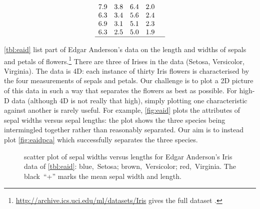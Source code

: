 \begin{example}
\begin{table}
\begin{equation*}
\begin{array}{rrrrl}
\\7.9&3.8&6.4&2.0&
\\6.3&3.4&5.6&2.4&
\\6.9&3.1&5.1&2.3&
\\6.3&2.5&5.0&1.9&
\\\hline
\end{array}
\end{equation*}
\end{table}
\autoref{tbl:eaid} list part of Edgar Anderson's data on the length and widths of sepals and petals of  flowers.\footnote{\url{http://archive.ics.uci.edu/ml/datasets/Iris} gives the full dataset \cite[]{Lichman2013}.}
There are three  of Irises in the data (Setosa, Versicolor, Virginia).
The data is 4D: each instance of thirty Iris flowers is characterised by the four measurements of sepals and petals.
Our challenge is to plot a 2D picture of this data in such a way that separates the flowers as best as possible.
For high-D data (although 4D is not really that high), simply plotting one characteristic against another is rarely useful.
For example,  \autoref{fig:eaid} plots the attributes of sepal widths versus sepal lengths: the plot shows the three species being intermingled together rather than reasonably separated.
Our aim is to instead plot \autoref{fig:eaidpca} which successfully separates the three species.

\begin{figure}
\centering
{}
\caption{scatter plot of sepal widths versus lengths for Edgar Anderson's Iris data of \autoref{tbl:eaid}: blue,~Setosa; brown,~Versicolor; red,~Virginia.  
The black~``+'' marks the mean sepal width and length.}
\label{fig:eaid}
\end{figure}


\end{example}
